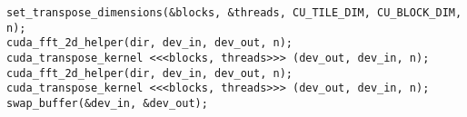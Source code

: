 \lstset{language=C++}
\begin{lstlisting}
set_transpose_dimensions(&blocks, &threads, CU_TILE_DIM, CU_BLOCK_DIM, n);    
cuda_fft_2d_helper(dir, dev_in, dev_out, n);
cuda_transpose_kernel <<<blocks, threads>>> (dev_out, dev_in, n);
cuda_fft_2d_helper(dir, dev_in, dev_out, n);
cuda_transpose_kernel <<<blocks, threads>>> (dev_out, dev_in, n);
swap_buffer(&dev_in, &dev_out);
\end{lstlisting}